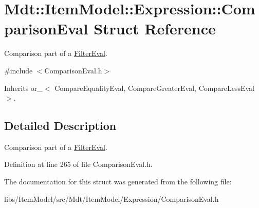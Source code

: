 \hypertarget{struct_mdt_1_1_item_model_1_1_expression_1_1_comparison_eval}{}\section{Mdt\+:\+:Item\+Model\+:\+:Expression\+:\+:Comparison\+Eval Struct Reference}
\label{struct_mdt_1_1_item_model_1_1_expression_1_1_comparison_eval}


Comparison part of a \hyperlink{struct_mdt_1_1_item_model_1_1_expression_1_1_filter_eval}{Filter\+Eval}.  




{\ttfamily \#include $<$Comparison\+Eval.\+h$>$}



Inherits or\+\_\+$<$ Compare\+Equality\+Eval, Compare\+Greater\+Eval, Compare\+Less\+Eval $>$.



\subsection{Detailed Description}
Comparison part of a \hyperlink{struct_mdt_1_1_item_model_1_1_expression_1_1_filter_eval}{Filter\+Eval}. 

Definition at line 265 of file Comparison\+Eval.\+h.



The documentation for this struct was generated from the following file\+:\begin{DoxyCompactItemize}
\item 
libs/\+Item\+Model/src/\+Mdt/\+Item\+Model/\+Expression/Comparison\+Eval.\+h\end{DoxyCompactItemize}
